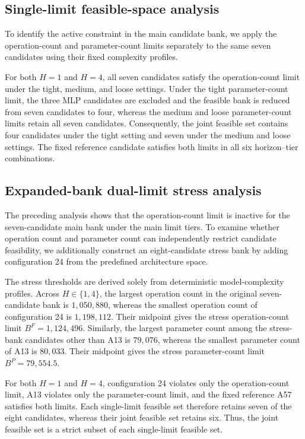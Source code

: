 \documentclass[11pt,a4paper]{article}
\begin{document}
\subsection{Single-limit feasible-space analysis}

To identify the active constraint in the main candidate bank, we apply the
operation-count and parameter-count limits separately to the same seven
candidates using their fixed complexity profiles.

For both $H=1$ and $H=4$, all seven candidates satisfy the operation-count
limit under the tight, medium, and loose settings. Under the tight
parameter-count limit, the three MLP candidates are excluded and the
feasible bank is reduced from seven candidates to four, whereas the medium
and loose parameter-count limits retain all seven candidates. Consequently,
the joint feasible set contains four candidates under the tight setting and
seven under the medium and loose settings. The fixed reference candidate
satisfies both limits in all six horizon--tier combinations.

\clearpage
\null
\vspace{-1.5em}
\subsection{Expanded-bank dual-limit stress analysis}

The preceding analysis shows that the operation-count limit is inactive for
the seven-candidate main bank under the main limit tiers.
To examine whether operation count and parameter count can independently
restrict candidate feasibility, we additionally construct an eight-candidate
stress bank by adding configuration 24 from the predefined architecture
space.

The stress thresholds are derived solely from deterministic model-complexity
profiles. Across $H\in\{1,4\}$, the largest operation count in the
original seven-candidate bank is $1{,}050{,}880$, whereas the smallest
operation count of configuration 24 is $1{,}198{,}112$. Their midpoint gives
the stress operation-count limit $B^{F}=1{,}124{,}496$. Similarly, the
largest parameter count among the stress-bank candidates other than A13 is
$79{,}076$, whereas the smallest parameter count of A13 is $80{,}033$.
Their midpoint gives the stress parameter-count limit
$B^{P}=79{,}554.5$.

For both $H=1$ and $H=4$, configuration 24 violates only the
operation-count limit, A13 violates only the parameter-count limit, and the
fixed reference A57 satisfies both limits. Each single-limit feasible set
therefore retains seven of the eight candidates, whereas their joint
feasible set retains six. Thus, the joint feasible set is a strict subset
of each single-limit feasible set.
\end{document}
